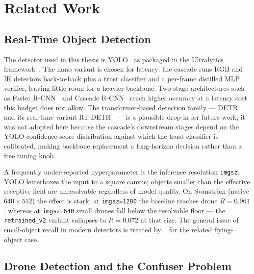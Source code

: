 \chapter{Related Work}
\label{ch:literature}

\section{Real-Time Object Detection}
\label{sec:lit_objdet}

The detector used in this thesis is YOLO~\cite{redmon2016yolo} as packaged in the Ultralytics framework~\cite{ultralytics2024}. The nano variant is chosen for latency: the cascade runs RGB and IR detectors back-to-back plus a trust classifier and a per-frame distilled MLP verifier, leaving little room for a heavier backbone. Two-stage architectures such as Faster R-CNN~\cite{ren2015fasterrcnn} and Cascade R-CNN~\cite{cai2018cascade} reach higher accuracy at a latency cost this budget does not allow. The transformer-based detection family --- DETR~\cite{carion2020detr} and its real-time variant RT-DETR~\cite{zhao2024rtdetr} --- is a plausible drop-in for future work; it was not adopted here because the cascade's downstream stages depend on the YOLO confidence-score distribution against which the trust classifier is calibrated, making backbone replacement a long-horizon decision rather than a free tuning knob.

A frequently under-reported hyperparameter is the inference resolution \texttt{imgsz}. YOLO letterboxes the input to a square canvas; objects smaller than the effective receptive field are unresolvable regardless of model quality. On Svanstr\"om (native $640\times512$) the effect is stark: at \texttt{imgsz=1280} the baseline reaches drone $R=0.961$, whereas at \texttt{imgsz=640} small drones fall below the resolvable floor --- the \texttt{retrained\_v2} variant collapses to $R=0.072$ at that size. The general issue of small-object recall in modern detectors is treated by \citeauthor{rozantsev2017detecting}~\cite{rozantsev2017detecting} for the related flying-object case.

\section{Drone Detection and the Confuser Problem}
\label{sec:lit_drone}

